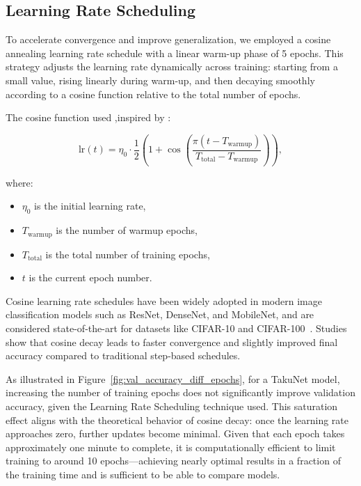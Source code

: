 \clearpage

\subsection{Learning Rate Scheduling}

To accelerate convergence and improve generalization, we employed a cosine annealing learning rate schedule with a linear warm-up phase of 5 epochs. This strategy adjusts the learning rate dynamically across training: starting from a small value, rising linearly during warm-up, and then decaying smoothly according to a cosine function relative to the total number of epochs. 

The cosine function used ,inspired by \cite{loshchilov2016sgdr} : 

\begin{equation}
\text{lr}(t) = \eta_0 \cdot \frac{1}{2} \left( 1 + \cos\left( \frac{\pi (t - T_\text{warmup})}{T_\text{total} - T_\text{warmup}} \right) \right),
\end{equation}

where:
\begin{itemize}
  \item \( \eta_0 \) is the initial learning rate,
  \item \( T_\text{warmup} \) is the number of warmup epochs,
  \item \( T_\text{total} \) is the total number of training epochs,
  \item \( t \) is the current epoch number.
\end{itemize}


Cosine learning rate schedules have been widely adopted in modern image classification models such as ResNet, DenseNet, and MobileNet, and are considered state-of-the-art for datasets like CIFAR-10 and CIFAR-100~\cite{lewkowycz2021decay}. Studies show that cosine decay leads to faster convergence and slightly improved final accuracy compared to traditional step-based schedules.

As illustrated in Figure~\ref{fig:val_accuracy_diff_epochs}, for a TakuNet model, increasing the number of training epochs does not significantly improve validation accuracy, given the Learning Rate Scheduling technique used. This saturation effect aligns with the theoretical behavior of cosine decay: once the learning rate approaches zero, further updates become minimal. Given that each epoch takes approximately one minute to complete, it is computationally efficient to limit training to around 10 epochs—achieving nearly optimal results in a fraction of the training time and is sufficient to be able to compare models.

